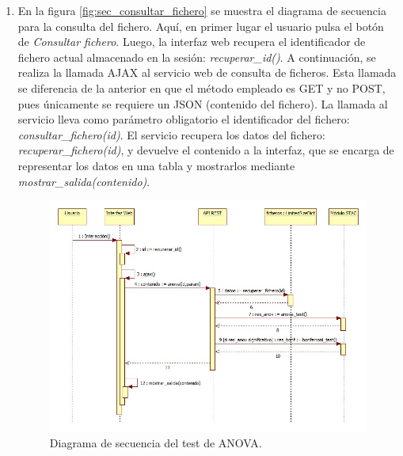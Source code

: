 \begin{enumerate}
\item En la figura \ref{fig:sec_consultar_fichero} se muestra el diagrama de secuencia para la consulta del fichero. Aquí, en primer lugar el usuario pulsa el botón de \textit{Consultar fichero}. Luego, la interfaz web recupera el identificador de fichero actual almacenado en la sesión: \textit{recuperar\_id()}. A continuación, se realiza la llamada AJAX al servicio web de consulta de ficheros. Esta llamada se diferencia de la anterior en que el método empleado es GET y no POST, pues únicamente se requiere un JSON (contenido del fichero). La llamada al servicio lleva como parámetro obligatorio el identificador del fichero: \textit{consultar\_fichero(id)}. El servicio recupera los datos del fichero: \textit{recuperar\_fichero(id)}, y devuelve el contenido a la interfaz, que se encarga de representar los datos en una tabla y mostrarlos mediante \textit{mostrar\_salida(contenido)}.

\begin{figure}[H]
\centering
\includegraphics[scale=0.5]{figuras/sec_anova.jpg}
\caption{Diagrama de secuencia del test de ANOVA.}
\label{fig:sec_anova}
\end{figure}


\end{enumerate}
